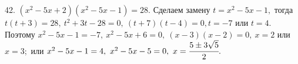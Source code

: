 42. $(x^2-5x+2)(x^2-5x-1)=28.$ Сделаем замену $t=x^2-5x-1,$ тогда $t(t+3)=28,\ t^2+3t-28=0,\ (t+7)(t-4)=0, t=-7$ или $t=4.$ Поэтому $x^2-5x-1=-7,\ x^2-5x+6=0,\
(x-3)(x-2)=0,\ x=2$ или $x=3;$ или $x^2-5x-1=4,\ x^2-5x-5=0,\ x=\cfrac{5\pm3\sqrt{5}}{2}.$\\
